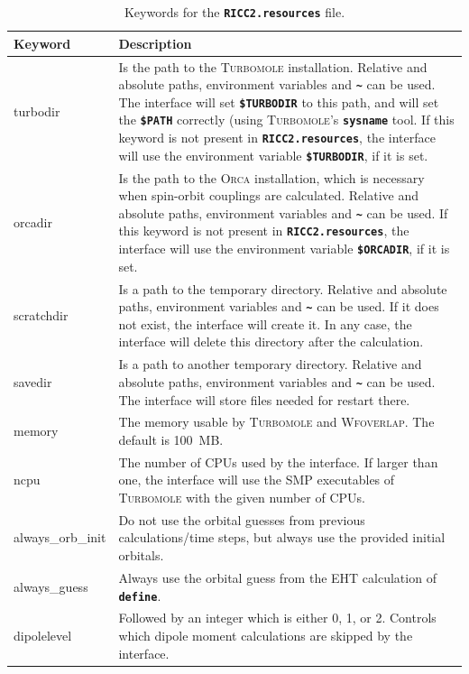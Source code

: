 \documentclass[a4paper,10pt,DIV=15,openany,twoside=false]{scrbook}
\newcommand{\ttt}[1]{\textbf{\texttt{#1}}}
\begin{document}
\begin{table}
  \centering
  \caption{Keywords for the \ttt{RICC2.resources} file.}
  \label{tab:ricc2_sh2}
  \begin{tabular}{>{\ttfamily}lp{12cm}}
  \toprule
  Keyword       &Description\\
  \midrule
turbodir        &Is the path to the \textsc{Turbomole} installation. Relative and absolute paths, environment variables and \ttt{\textasciitilde} can be used. The interface will set \ttt{\$TURBODIR} to this path, and will set the \ttt{\$PATH} correctly (using \textsc{Turbomole}'s \ttt{sysname} tool. If this keyword is not present in \ttt{RICC2.resources}, the interface will use the environment variable \ttt{\$TURBODIR}, if it is set.\\
orcadir         &Is the path to the \textsc{Orca} installation, which is necessary when spin-orbit couplings are calculated. Relative and absolute paths, environment variables and \ttt{\textasciitilde} can be used. If this keyword is not present in \ttt{RICC2.resources}, the interface will use the environment variable \ttt{\$ORCADIR}, if it is set.\\
scratchdir      &Is a path to the temporary directory. Relative and absolute paths, environment variables and \ttt{\textasciitilde} can be used. If it does not exist, the interface will create it. In any case, the interface will delete this directory after the calculation.\\
savedir         &Is a path to another temporary directory.  Relative and absolute paths, environment variables and \ttt{\textasciitilde} can be used. The interface will store files needed for restart there.\\
memory          &The memory usable by \textsc{Turbomole} and \textsc{Wfoverlap}. The default is 100~MB.\\
ncpu            & The number of CPUs used by the interface. If larger than one, the interface will use the SMP executables of \textsc{Turbomole} with the given number of CPUs.\\
always\_orb\_init &Do not use the orbital guesses from previous calculations/time steps, but always use the provided initial orbitals.\\
always\_guess   &Always use the orbital guess from the EHT calculation of \ttt{define}.\\
dipolelevel     &Followed by an integer which is either 0, 1, or 2. Controls which dipole moment calculations are skipped by the interface.\\

\end{tabular}
\end{table}
\end{document}
